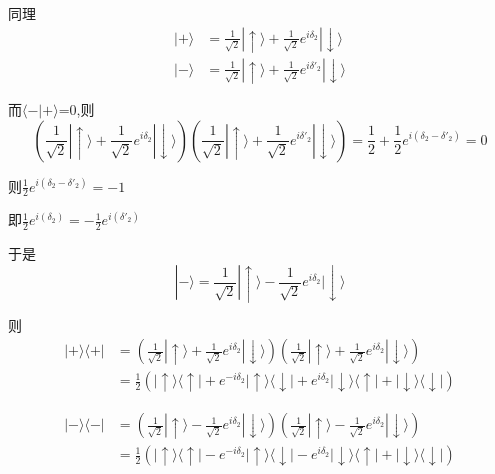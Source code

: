 \documentclass[lang=cn,15pt]{elegantbook}
\begin{document}
 同理
 \begin{equation*}
 	\begin{split}
 		|+\rangle &=\frac{1}{\sqrt{2}}|\uparrow \rangle +\frac{1}{\sqrt{2}}e^{i\delta _2}|\downarrow \rangle 
 		\\
 		|-\rangle &=\frac{1}{\sqrt{2}}|\uparrow \rangle +\frac{1}{\sqrt{2}}e^{i\delta' _2}|\downarrow \rangle 
 	\end{split}
 \end{equation*}
 
 而$\langle -|+\rangle$=0,则
 \begin{equation*}
 	\left( \frac{1}{\sqrt{2}}|\uparrow \rangle +\frac{1}{\sqrt{2}}e^{i\delta _2}|\downarrow \rangle \right) \left( \frac{1}{\sqrt{2}}|\uparrow \rangle +\frac{1}{\sqrt{2}}e^{i\delta' _2}|\downarrow \rangle \right) =\frac{1}{2}+\frac{1}{2}e^{i\left( \delta _2-\delta' _2 \right)}=0
 \end{equation*}
 
 则$\frac{1}{2}e^{i\left( \delta _2-\delta' _2 \right)}=-1$
 
 即$\frac{1}{2}e^{i\left( \delta _2 \right)}=-\frac{1}{2}e^{i\left( \delta' _2 \right)}$
 
 于是
 \begin{equation*}
 	|-\rangle =\frac{1}{\sqrt{2}}|\uparrow \rangle -\frac{1}{\sqrt{2}}e^{i\delta _2}|\downarrow \rangle
 \end{equation*}
 
 则\begin{equation*}
 	\begin{split}
 		|+\rangle \langle +|&=\left( \frac{1}{\sqrt{2}}|\uparrow \rangle +\frac{1}{\sqrt{2}}e^{i\delta _2}|\downarrow \rangle \right) \left( \frac{1}{\sqrt{2}}|\uparrow \rangle +\frac{1}{\sqrt{2}}e^{i\delta _2}|\downarrow \rangle \right) 
 		\\
 		&=\frac{1}{2}\left( |\uparrow \rangle \langle \uparrow |+e^{-i\delta _2}|\uparrow \rangle \langle \downarrow |+e^{i\delta _2}|\downarrow \rangle \langle \uparrow |+|\downarrow \rangle \langle \downarrow | \right) 
 	\end{split}
 \end{equation*}
 
 \begin{equation*}
 	\begin{split}
 		|-\rangle \langle -|&=\left( \frac{1}{\sqrt{2}}|\uparrow \rangle -\frac{1}{\sqrt{2}}e^{i\delta _2}|\downarrow \rangle \right) \left( \frac{1}{\sqrt{2}}|\uparrow \rangle -\frac{1}{\sqrt{2}}e^{i\delta _2}|\downarrow \rangle \right) 
 		\\
 		&=\frac{1}{2}\left( |\uparrow \rangle \langle \uparrow |-e^{-i\delta _2}|\uparrow \rangle \langle \downarrow |-e^{i\delta _2}|\downarrow \rangle \langle \uparrow |+|\downarrow \rangle \langle \downarrow | \right) 
 	\end{split}
 \end{equation*}
 
\end{document}

